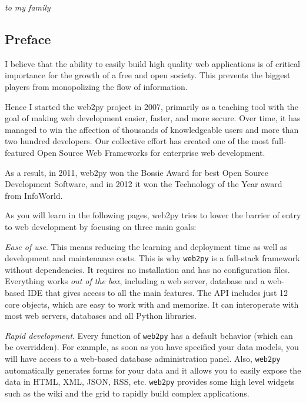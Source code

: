 \documentclass[justified,sixbynine,notoc]{tufte-book}
\def\ft{\small\tt}
\begin{document}
\newpage
\nohyphenation
\thispagestyle{empty}
\phantom{placeholder}
\vspace{2in}
\hskip 3in
{\it to my family}
\newpage
\thispagestyle{empty}
\phantom {a}
\newpage

\setlength{\cftparskip}{\baselineskip}
\tableofcontents

\mainmatter
\begin{fullwidth}


\chapter*{Preface}
I believe that the ability to easily build high quality web applications is of critical importance for the growth of a free and open society. This prevents the biggest players from monopolizing the flow of information.

Hence I started the web2py project in 2007, primarily as a teaching tool with the goal of making web development easier, faster, and more secure. Over time, it has managed to win the affection of thousands of knowledgeable users and more than two hundred developers. Our collective effort has created one of the most full-featured Open Source Web Frameworks for enterprise web development.

As a result, in 2011, web2py won the Bossie Award for best Open Source Development Software, and in 2012 it won the Technology of the Year award from InfoWorld.

As you will learn in the following pages, web2py tries to lower the barrier of entry to web development by focusing on three main goals:

{\it Ease of use}. This means reducing the learning and deployment time as well as development and maintenance costs. This is why {\ft web2py} is a full-stack framework without dependencies. It requires no installation and has no configuration files. Everything works {\it out of the box}, including a web server, database and a web-based IDE that gives access to all the main features. The API includes just 12 core objects, which are easy to work with and memorize. It can interoperate with most web servers, databases and all Python libraries.

{\it Rapid development}. Every function of {\ft web2py} has a default behavior (which can be overridden).  For example, as soon as you have specified your data models, you will have access to a web-based database administration panel. Also, {\ft web2py} automatically generates forms for your data and it allows you to easily expose the data in HTML, XML, JSON, RSS, etc. {\ft web2py} provides some high level widgets such as the wiki and the grid to rapidly build complex applications.


\end{fullwidth}
\end{document}

